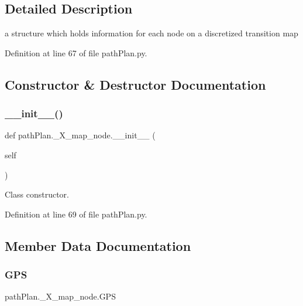 \subsection{Detailed Description}
a structure which holds information for each node on a discretized transition map 

Definition at line 67 of file path\+Plan.\+py.



\subsection{Constructor \& Destructor Documentation}
\mbox{\label{classpath_plan_1_1___x__map__node_a73f6059a5ffe61cf3c79d9ac682ccf92}} 
\subsubsection{\texorpdfstring{\+\_\+\+\_\+init\+\_\+\+\_\+()}{\_\_init\_\_()}}
{\footnotesize\ttfamily def path\+Plan.\+\_\+\+X\+\_\+map\+\_\+node.\+\_\+\+\_\+init\+\_\+\+\_\+ (\begin{DoxyParamCaption}\item[{}]{self }\end{DoxyParamCaption})}



Class constructor. 



Definition at line 69 of file path\+Plan.\+py.



\subsection{Member Data Documentation}
\mbox{\label{classpath_plan_1_1___x__map__node_a4d104762b4f90c3b130ff6292732299d}} 
\subsubsection{\texorpdfstring{G\+PS}{GPS}}
{\footnotesize\ttfamily path\+Plan.\+\_\+\+X\+\_\+map\+\_\+node.\+G\+PS}



